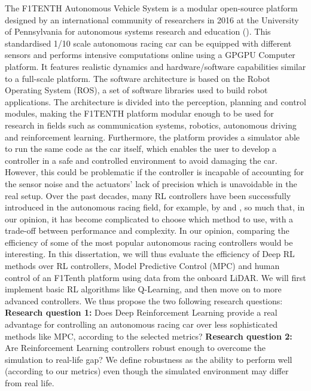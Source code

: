 The F1TENTH Autonomous Vehicle System is a modular open-source platform designed by an international community of researchers in 2016 at the University of Pennsylvania for autonomous systems research and education (\cite{okelly2019}). This standardised 1/10 scale autonomous racing car can be equipped with different sensors and performs intensive computations online using a GPGPU Computer platform. It features realistic dynamics and hardware/software capabilities similar to a full-scale platform. The software architecture is based on the Robot Operating System (ROS), a set of software libraries used to build robot applications. The architecture is divided into the perception, planning and control modules, making the F1TENTH  platform modular enough to be used for research in fields such as communication systems, robotics, autonomous driving and reinforcement learning. Furthermore, the platform provides a simulator able to run the same code as the car itself, which enables the user to develop a controller in a safe and controlled environment to avoid damaging the car. However, this could be problematic if the controller is incapable of accounting for the sensor noise and the actuators' lack of precision which is unavoidable in the real setup.
	\newline
Over the past decades, many RL controllers have been successfully introduced in the autonomous racing field, for example, by \cite{sim2real} and \cite{granturismo}, so much that, in our opinion, it has become complicated to choose which method to use, with a trade-off between performance and complexity. In our opinion, comparing the efficiency of some of the most popular autonomous racing controllers would be interesting. In this dissertation, we will thus evaluate the efficiency of Deep RL methods over RL controllers, Model Predictive Control (MPC) and human control of an F1Tenth platform using data from the onboard LiDAR. We will first implement basic RL algorithms like Q-Learning, and then move on to more advanced controllers. We thus propose the two following research questions:
\newline
\textbf{Research question 1:} Does Deep Reinforcement Learning provide a real advantage for controlling an autonomous racing car over less sophisticated methods like MPC, according to the selected metrics?
\newline
\textbf{Research question 2:} Are Reinforcement Learning controllers robust enough to overcome the simulation to real-life gap? We define robustness as the ability to perform well (according to our metrics) even though the simulated environment may differ from real life.
